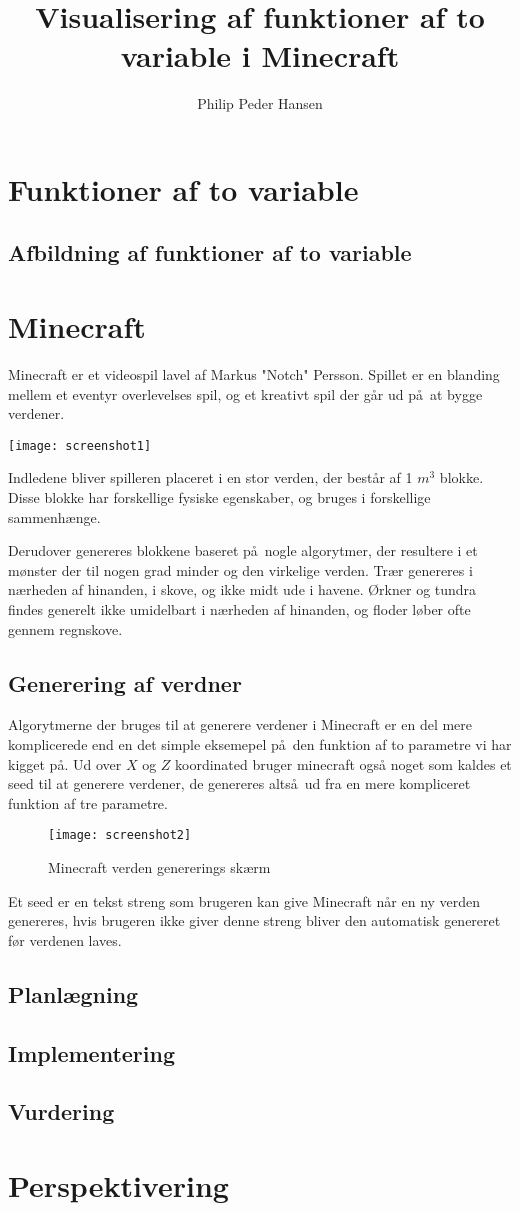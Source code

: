 \documentclass[a4paper,12pt]{report}
\author{Philip Peder Hansen}
\title{Visualisering af funktioner af to variable i Minecraft}
\begin{document}
	\maketitle
	\tableofcontents
	\clearpage
	\section{Funktioner af to variable}
	\subsection{Afbildning af funktioner af to variable}
	\section{Minecraft}
		Minecraft er et videospil lavel af Markus "Notch" Persson.
		Spillet er en blanding mellem et eventyr overlevelses spil, og et kreativt spil der g\aa r ud p\aa \ at bygge verdener.

		\vspace{5 mm}
		\texttt{[image: screenshot1]}
		\vspace{5 mm}

		Indledene bliver spilleren placeret i en stor verden, der best\aa r af 1 $m^3$ blokke. Disse blokke har forskellige fysiske egenskaber,
		og bruges i forskellige sammenh\ae nge.

		Derudover genereres blokkene baseret p\aa \ nogle algorytmer, der resultere i et m\o nster der til nogen grad minder
		og den virkelige verden. Tr\ae r genereres i n\ae rheden af hinanden, i skove, og ikke midt ude i havene.
		\O rkner og tundra findes generelt ikke umidelbart i n\ae rheden af hinanden, og floder l\o ber ofte gennem regnskove. 
	\subsection{Generering af verdner}
		Algorytmerne der bruges til at generere verdener i Minecraft er en del mere komplicerede end en det simple eksemepel p\aa \ den funktion
		af to parametre vi har kigget p\aa . Ud over $X$ og $Z$ koordinated bruger minecraft også noget som kaldes et seed til at generere
		verdener, de genereres alts\aa \ ud fra en mere kompliceret funktion af tre parametre.
		
		\begin{wrapfigure}{r}{0.5\textwidth}
			\texttt{[image: screenshot2]}
			\caption{Minecraft verden genererings sk\ae rm}
		\end{wrapfigure}

		Et seed er en tekst streng som brugeren kan give Minecraft n\aa r en ny verden genereres, hvis brugeren ikke giver denne streng
		bliver den automatisk genereret f\o r verdenen laves.
	\subsection{Planlægning}
	\subsection{Implementering}
	\subsection{Vurdering}
	\section{Perspektivering}
\end{document}
